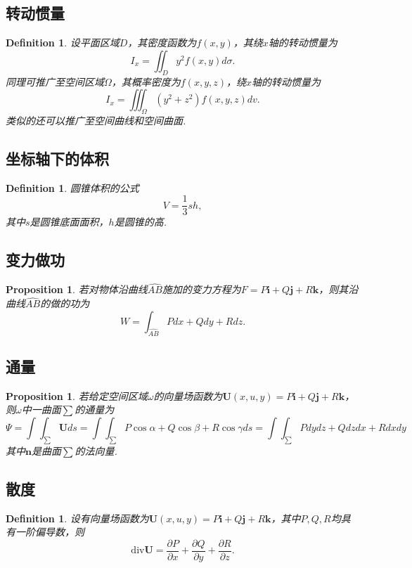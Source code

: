 \documentclass{article}
\newcommand{\mbf}[1]{\bm{#1}}
\newtheorem{proposition}[theorem]{Proposition}
\newtheorem{definition}[theorem]{Definition}
\begin{document}
\subsection{转动惯量}

\begin{definition}
\rm 设平面区域$D$，其密度函数为$f(x,y)$，其绕$x$轴的转动惯量为
$$
I_x = \iint_D y^2 f(x,y)d\sigma.
$$
同理可推广至空间区域$\Omega$，其概率密度为$f(x,y,z)$，绕$x$轴的转动惯量为
$$
I_x = \iiint_\Omega (y^2+z^2) f(x,y,z)dv.
$$
类似的还可以推广至空间曲线和空间曲面. 
\end{definition}

\subsection{坐标轴下的体积}

\begin{definition}
\rm 圆锥体积的公式
$$
V = \frac{1}{3}sh,
$$
其中$s$是圆锥底面面积，$h$是圆锥的高. 
\end{definition}

\subsection{变力做功}

\begin{proposition}
\rm 若对物体沿曲线$\widehat{AB}$施加的变力方程为$F = P\mbf{i}+Q\mbf{j}+R\mbf{k}$，则其沿曲线$\widehat{AB}$的做的功为
$$
W = \int_{\widehat{AB}}  Pdx+Qdy+Rdz. 
$$
\end{proposition}

\subsection{通量}

\begin{proposition}
\rm 若给定空间区域$\omega$的向量场函数为$\mbf{U}(x,u,y)=P\mbf{i}+Q\mbf{j}+R\mbf{k}$，则$\omega$中一曲面$\sum$的通量为
$$
\Psi = \int\int_\sum \mbf{U} ds= \int\int_\sum P\cos\alpha+Q\cos\beta+R\cos\gamma ds  = \int\int_\sum Pdydz + Qdzdx + Rdxdy
$$
其中$\mbf{n}$是曲面$\sum$的法向量. 
\end{proposition}

\subsection{散度}

\begin{definition}
\rm 设有向量场函数为$\mbf{U}(x,u,y)=P\mbf{i}+Q\mbf{j}+R\mbf{k}$，其中$P,Q,R$均具有一阶偏导数，则
$$
\text{div} \mbf{U} = \frac{\partial P}{\partial x} + \frac{\partial Q}{\partial y} + \frac{\partial R}{\partial z}.
$$
\end{definition}
\end{document}
